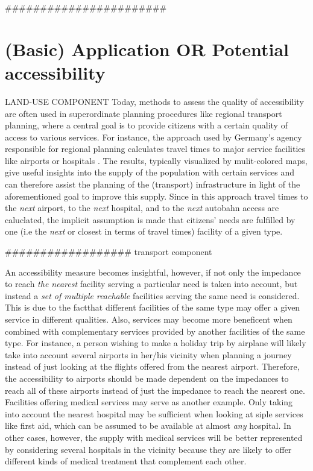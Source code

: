 #######################

\section{(Basic) Application OR Potential accessibility} LAND-USE COMPONENT
Today, methods to assess the quality of accessibility
are often used in superordinate planning procedures like regional transport planning, where a central goal is to provide 
citizens with a certain quality of access to various services. For instance, the approach used by Germany's agency 
responsible for regional planning calculates travel times to major service facilities like airports or hospitals \citep{BBSR20xxErreichbarkeitsmodell}. %
The results, typically visualized by mulit-colored maps, give useful insights into the supply of the population with 
certain services and can therefore assist the planning of the (transport) infrastructure in light of the aforementioned goal to improve 
this supply. Since in this approach travel times to the \textit{next} airport, to the \textit{next} hospital, and to the \textit{next} 
autobahn access are caluclated, the implicit assumption is made that citizens' needs are fulfilled by one (i.e the \textit{next} 
or closest in terms of travel times) facility of a given type.

################## transport component

An accessibility measure becomes insightful, however, if not only the impedance to reach \textit{the nearest} facility 
serving a particular need is taken into account, but instead a \textit{set of multiple reachable} facilities serving the same 
need is considered. This is due to the factthat different facilities of the same type may offer a given service in 
different qualities. Also, services may become more beneficent when combined with complementary services provided by 
another facilities of the same type. For instance, a person wishing to make a holiday trip by airplane will likely 
take into account several airports in her/his vicinity when planning a journey instead of just looking at the flights 
offered from the nearest airport. Therefore, the accessibility to airports should be made dependent on the impedances 
to reach all of these airports instead of just the impedance to reach the nearest one. Facilities offering medical 
services may serve as another example. Only taking into account the nearest hospital may be sufficient when looking 
at siple services like first aid, which can be assumed to be available at almost \textit{any} hospital. In other cases, 
however, the supply with medical services will be better represented by considering several hospitals in the vicinity 
because they are likely to offer different kinds of medical treatment that complement each other. 

